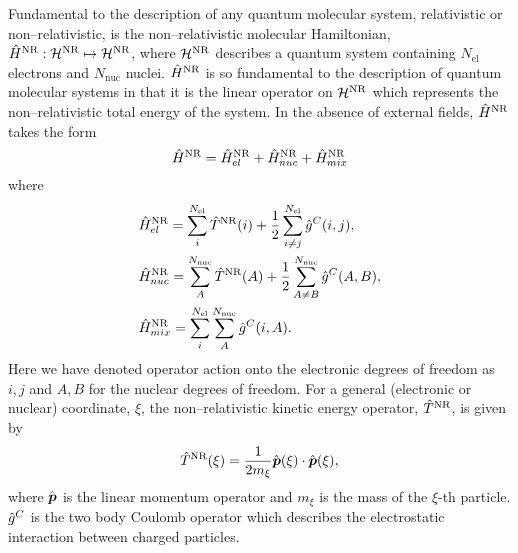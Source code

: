 Fundamental to the description of any quantum molecular system, relativistic or non--relativistic, is the non--relativistic
molecular Hamiltonian, $\hat{H}^{\mathrm{NR}} : \mathcal{H}^{\mathrm{NR}} \mapsto \mathcal{H}^{\mathrm{NR}}$, where $\mathcal{H}^{\mathrm{NR}}$ describes a quantum
system containing $N_\mathrm{el}$ electrons and $N_\mathrm{nuc}$ nuclei. $\hat{H}^{\mathrm{NR}}$ is so fundamental to the description
of quantum molecular systems in that it is the linear operator on $\mathcal{H}^{\mathrm{NR}}$ which represents the non--relativistic 
total energy of the system.  In the absence of external fields, $\hat{H}^{\mathrm{NR}}$ takes the form
\begin{equation}
  \label{eq:FullHNR}
  \hat{H}^{\mathrm{NR}} = \hat{H}_{el}^{\mathrm{NR}} + \hat{H}_{nuc}^{\mathrm{NR}} + \hat{H}_{mix}^{\mathrm{NR}}
\end{equation}
where 
\begin{subequations}
\begin{align}
  &\hat{H}_{el}^{\mathrm{NR}}  = \sum_i^{N_\mathrm{el}}\hat{T}^{\mathrm{NR}}(i) + \frac{1}{2}\sum_{i \neq j}^{N_\mathrm{el}} \hat{g}^C(i,j),\\ 
  &\hat{H}_{nuc}^{\mathrm{NR}} = \sum_A^{N_\mathrm{nuc}}\hat{T}^{\mathrm{NR}}(A) + \frac{1}{2}\sum_{A \neq B}^{N_\mathrm{nuc}} \hat{g}^C(A,B),\\ 
  &\hat{H}^{\mathrm{NR}}_{mix} = \sum_i^{N_\mathrm{el}} \sum_A^{N_\mathrm{nuc}} \hat{g}^C(i,A).
\end{align}
\end{subequations}
Here we have denoted operator action onto the electronic degrees of freedom as $i,j$ and $A,B$ for the nuclear degrees of
freedom. For a general (electronic or nuclear) coordinate, $\xi$, the non--relativistic kinetic energy operator, 
$\hat{T}^{\mathrm{NR}}$, is given by
\begin{align}
  \hat{T}^{\mathrm{NR}}(\xi) = \frac{1}{2m_\xi} \hat{\boldsymbol{p}}(\xi) \cdot \hat{\boldsymbol{p}}(\xi),
\end{align}
where $\hat{\boldsymbol{p}}$ is the linear momentum operator and $m_\xi$ is the mass of the $\xi$-th particle.
$\hat{g}^C$ is the two body Coulomb operator which describes the electrostatic interaction between charged particles.

